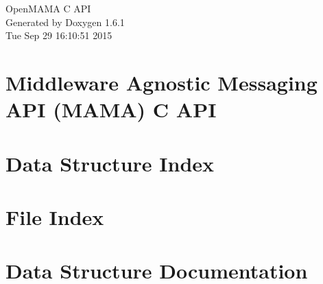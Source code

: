 \documentclass[a4paper]{book}
\begin{document}
\hypersetup{pageanchor=false}
\begin{titlepage}
\vspace*{7cm}
\begin{center}
{\Large OpenMAMA C API }\\
\vspace*{1cm}
{\large Generated by Doxygen 1.6.1}\\
\vspace*{0.5cm}
{\small Tue Sep 29 16:10:51 2015}\\
\end{center}
\end{titlepage}
\clearemptydoublepage
{}
\tableofcontents
\clearemptydoublepage
{}
\hypersetup{pageanchor=true}
\chapter{Middleware Agnostic Messaging API (MAMA) C API}
\label{index}\hypertarget{index}{}
\chapter{Data Structure Index}

\chapter{File Index}

\chapter{Data Structure Documentation}








\end{document}
